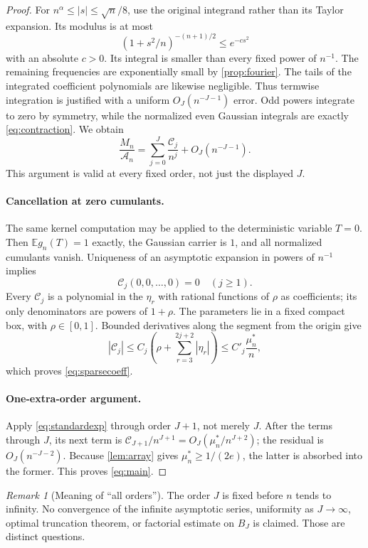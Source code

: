 \documentclass[11pt,a4paper]{article}
\numberwithin{equation}{section}
\theoremstyle{definition}\newtheorem{definition}[theorem]{Definition}
\theoremstyle{remark}\newtheorem{remark}[theorem]{Remark}
\newcommand{\E}{\mathbb E}
\newcommand{\Cj}{\mathscr C}
\newcommand{\A}{\mathcal A}
\begin{document}
\begin{proof}
For $n^\alpha\le|s|\le\sqrt n/8$, use the original integrand rather than its Taylor expansion. Its modulus is at most
\[
 (1+s^2/n)^{-(n+1)/2}\le e^{-c s^2}
\]
with an absolute $c>0$. Its integral is smaller than every fixed power of $n^{-1}$. The remaining frequencies are exponentially small by \cref{prop:fourier}. The tails of the integrated coefficient polynomials are likewise negligible. Thus termwise integration is justified with a uniform $O_J(n^{-J-1})$ error. Odd powers integrate to zero by symmetry, while the normalized even Gaussian integrals are exactly \eqref{eq:contraction}. We obtain
\begin{equation}\label{eq:standardexp}
 \frac{M_n}{\A_n}=\sum_{j=0}^{J}\frac{\Cj_j}{n^j}+O_J(n^{-J-1}).
\end{equation}
This argument is valid at every fixed order, not just the displayed $J$.

\paragraph{Cancellation at zero cumulants.}
The same kernel computation may be applied to the deterministic variable $T=0$. Then $\E g_n(T)=1$ exactly, the Gaussian carrier is $1$, and all normalized cumulants vanish. Uniqueness of an asymptotic expansion in powers of $n^{-1}$ implies
\begin{equation}\label{eq:zero}
 \Cj_j(0,0,\ldots,0)=0\quad(j\ge1).
\end{equation}
Every $\Cj_j$ is a polynomial in the $\eta_r$ with rational functions of $\rho$ as coefficients; its only denominators are powers of $1+\rho$. The parameters lie in a fixed compact box, with $\rho\in[0,1]$. Bounded derivatives along the segment from the origin give
\[
 |\Cj_j|\le C_j\left(\rho+\sum_{r=3}^{2j+2}|\eta_r|\right)
 \le C'_j\frac{\mu_n^*}{n},
\]
which proves \eqref{eq:sparsecoeff}.

\paragraph{One-extra-order argument.}
Apply \eqref{eq:standardexp} through order $J+1$, not merely $J$. After the terms through $J$, its next term is
$\Cj_{J+1}/n^{J+1}=O_J(\mu_n^*/n^{J+2})$; the residual is $O_J(n^{-J-2})$.
Because \cref{lem:array} gives $\mu_n^*\ge1/(2e)$, the latter is absorbed into the former. This proves \eqref{eq:main}.
\end{proof}

\begin{remark}[Meaning of ``all orders'']
The order $J$ is fixed before $n$ tends to infinity. No convergence of the infinite asymptotic series, uniformity as $J\to\infty$, optimal truncation theorem, or factorial estimate on $B_J$ is claimed. Those are distinct questions.
\end{remark}
\end{document}
